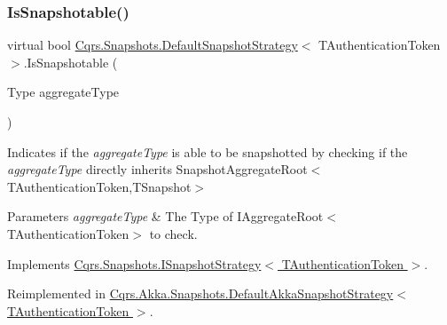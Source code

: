 \subsubsection{\texorpdfstring{Is\+Snapshotable()}{IsSnapshotable()}}
{\footnotesize\ttfamily virtual bool \hyperlink{classCqrs_1_1Snapshots_1_1DefaultSnapshotStrategy}{Cqrs.\+Snapshots.\+Default\+Snapshot\+Strategy}$<$ T\+Authentication\+Token $>$.Is\+Snapshotable (\begin{DoxyParamCaption}\item[{Type}]{aggregate\+Type }\end{DoxyParamCaption})\hspace{0.3cm}{\ttfamily [virtual]}}



Indicates if the {\itshape aggregate\+Type}  is able to be snapshotted by checking if the {\itshape aggregate\+Type}  directly inherits Snapshot\+Aggregate\+Root$<$\+T\+Authentication\+Token,\+T\+Snapshot$>$ 


\begin{DoxyParams}{Parameters}
{\em aggregate\+Type} & The Type of I\+Aggregate\+Root$<$\+T\+Authentication\+Token$>$ to check.\\
\hline
\end{DoxyParams}


Implements \hyperlink{interfaceCqrs_1_1Snapshots_1_1ISnapshotStrategy_a02121821312c4ce2811b31eeaffabe51_a02121821312c4ce2811b31eeaffabe51}{Cqrs.\+Snapshots.\+I\+Snapshot\+Strategy$<$ T\+Authentication\+Token $>$}.



Reimplemented in \hyperlink{classCqrs_1_1Akka_1_1Snapshots_1_1DefaultAkkaSnapshotStrategy_ad7d9bb43fc53cf16a242510612f4c13e_ad7d9bb43fc53cf16a242510612f4c13e}{Cqrs.\+Akka.\+Snapshots.\+Default\+Akka\+Snapshot\+Strategy$<$ T\+Authentication\+Token $>$}.

\mbox{\label{classCqrs_1_1Snapshots_1_1DefaultSnapshotStrategy_a9cdb3d79c55e2eb2796639b273d49ed9_a9cdb3d79c55e2eb2796639b273d49ed9}} 
